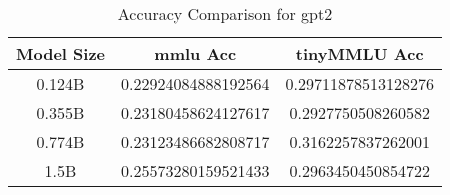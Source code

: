 \begin{table}[h!]
\centering
\begin{tabular}{|c|c|c|}
\hline
Model Size & mmlu Acc & tinyMMLU Acc \\ 
\hline
0.124B & 0.22924084888192564 & 0.29711878513128276 \\ 
\hline
0.355B & 0.23180458624127617 & 0.2927750508260582 \\ 
\hline
0.774B & 0.23123486682808717 & 0.3162257837262001 \\ 
\hline
1.5B & 0.25573280159521433 & 0.2963450450854722 \\ 
\hline
\end{tabular}
\caption{Accuracy Comparison for gpt2}
\end{table}
